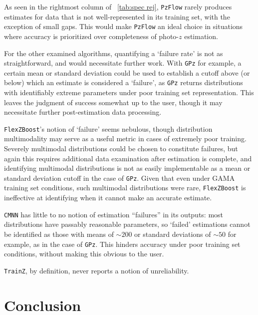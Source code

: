 \documentclass[fleqn,usenatbib,useAMS]{mnras}
\newcommand{\PersonalTag}[3]{{\color{#2}{$^{#1}$ [#3}]}}
\newcommand{\alice}[1]{\PersonalTag{Alice}{olive}{#1}}
\newcommand{\rachel}[1]{\PersonalTag{Rachel}{orange}{#1}}
\newcommand{\refresponse}[1]{{\color{black}{#1}}}
\newcommand{\cwr}[1]{{\color{black}{#1}}}
\begin{document}
As seen in the rightmost column of \cwr{Table}~\ref{tab:spec rej}, \texttt{PzFlow} rarely produces estimates for data that is not well-represented in its training set, with the exception of small gaps. 
This would make \texttt{PzFlow} an ideal choice in situations where accuracy is prioritized over completeness of photo-$z$ estimation.

For the other examined algorithms, quantifying a `failure rate' is not as straightforward, and would necessitate further work. With \texttt{GPz} for example, a certain mean or standard deviation could be used to establish a cutoff above (or below) which an estimate is considered a `failure', as \texttt{GPz} returns distributions with identifiably %
extreme parameters under poor training set representation. This leaves the judgment of success somewhat up to the user, though it may necessitate further post-estimation data processing. 

\texttt{FlexZBoost}'s notion of `failure' seems nebulous, though distribution multimodality may serve as a useful metric in cases of extremely poor training. Severely multimodal distributions could be chosen to constitute failures, but again this requires additional data examination after estimation is complete, and identifying multimodal distributions is not as easily implementable as a mean or standard deviation cutoff in the case of \texttt{GPz}. Given that even under GAMA training set conditions, such multimodal distributions were rare, \texttt{FlexZBoost} is ineffective at identifying when it cannot make an accurate estimate.

\texttt{CMNN} has little to no notion of estimation ``failures'' in its outputs: most distributions have passably reasonable parameters, so `failed' estimations cannot be identified as those with means of $\sim$$200$ or standard deviations of $\sim$$50$ for example, as in the case of \texttt{GPz}. This hinders accuracy under poor training set conditions, without making this obvious to the user. 

\texttt{TrainZ}, by definition, never reports a notion of unreliability. 


\section{Conclusion}
\label{sec:conclusion}


\refresponse{Incompleteness and non-representativeness of spectroscopic training sets are common problems for photometric redshift estimation with deep imaging surveys.  In this work, we have investigated how a variety of metrics commonly used to quantify the performance of photometric redshift algorithms in RAIL react to (and can serve as diagnostics of) imperfections in spectroscopic training samples.  We considered the case of inverse redshift incompleteness, and non-representativeness associated with a variety of spectroscopic surveys.  The photo-$z$ performance metrics were applied to multiple different photo-$z$ algorithms -- without attempting to optimize or fine-tune their hyper-parameters -- as a demonstration of how these metrics react to training set imperfections.}
\end{document}
